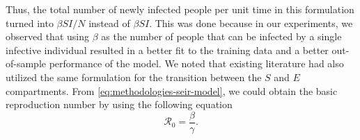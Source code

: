 Thus, the total number of newly infected people per unit time in this formulation turned into $\beta SI / N$ instead of $\beta SI$.
This was done because in our experiments, we observed that using $\beta$ as the number of people that can be infected by a single infective individual resulted in a better fit to the training data and a better out-of-sample performance of the model.
We noted that existing literature \cite{arikInterpretableSequenceLearning, bastosModelingForecastingEarly2020,dengDynamicsDevelopmentCOVID192020, heSEIRModelingCOVID192020,ihmecovid-19forecastingteamModelingCOVID19Scenarios2021, ndairouMathematicalModelingCOVID192020,sarkarModelingForecastingCOVID192020, zhaoModelingEpidemicDynamics2020} had also utilized the same formulation for the transition between the $S$ and $E$ compartments.
From \autoref{eq:methodologies-seir-model}, we could obtain the basic reproduction number by using the following equation
\begin{equation*}
    \mathcal{R}_0 = \frac{\beta}{\gamma}.
    \label{eq:methodologies-seir-reproduction-number}
\end{equation*}

